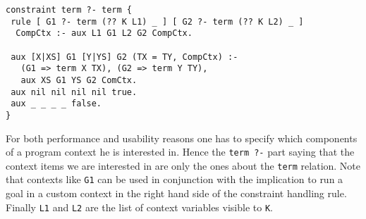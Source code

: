 \documentclass[preprint]{sigplanconf}
\begin{document}
{\small
\begin{verbatim}
constraint term ?- term {
 rule [ G1 ?- term (?? K L1) _ ] [ G2 ?- term (?? K L2) _ ]
  CompCtx :- aux L1 G1 L2 G2 CompCtx.

 aux [X|XS] G1 [Y|YS] G2 (TX = TY, CompCtx) :-
   (G1 => term X TX), (G2 => term Y TY),
   aux XS G1 YS G2 ComCtx.
 aux nil nil nil nil true.
 aux _ _ _ _ false.   
}
\end{verbatim}
}

For both performance and usability reasons one has to specify
which components of a program context he is interested in.  Hence the
\verb+term ?-+ part saying that the context items we are interested in
are only the ones about the \verb+term+ relation.  Note that contexts like
\verb+G1+ can be used in conjunction with the implication to run
a goal in a custom context in the right hand side of the constraint
handling rule. Finally \verb+L1+ and \verb+L2+ are the list
of context variables visible to \verb+K+.
\end{document}
